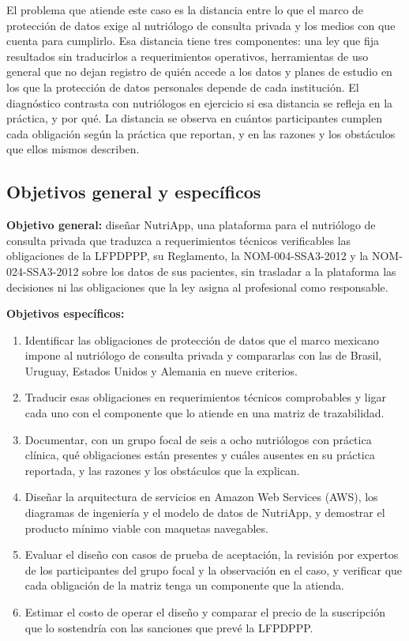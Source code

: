 \documentclass[12pt, a4paper]{article}
\begin{document}
El problema que atiende este caso es la distancia entre lo que el marco
de protección de datos exige al nutriólogo de consulta privada y los
medios con que cuenta para cumplirlo. Esa distancia tiene tres
componentes: una ley que fija resultados sin traducirlos a
requerimientos operativos, herramientas de uso general que no dejan
registro de quién accede a los datos y planes de estudio en los que la
protección de datos personales depende de cada institución. El
diagnóstico contrasta con nutriólogos en ejercicio si esa distancia se
refleja en la práctica, y por qué. La distancia se observa en cuántos
participantes cumplen cada obligación según la práctica que reportan, y
en las razones y los obstáculos que ellos mismos describen.

\subsection{Objetivos general y específicos}
\textbf{Objetivo general:} diseñar NutriApp, una plataforma para el
nutriólogo de consulta privada que traduzca a requerimientos técnicos
verificables las obligaciones de la LFPDPPP, su Reglamento, la
NOM-004-SSA3-2012 y la NOM-024-SSA3-2012 sobre los datos de sus
pacientes, sin trasladar a la plataforma las decisiones ni las
obligaciones que la ley asigna al profesional como responsable.
 
\textbf{Objetivos específicos:}
 
\begin{enumerate}
  \item Identificar las obligaciones de protección de datos que el
    marco mexicano impone al nutriólogo de consulta privada y
    compararlas con las de Brasil, Uruguay, Estados Unidos y Alemania
    en nueve criterios.
  \item Traducir esas obligaciones en requerimientos técnicos
    comprobables y ligar cada uno con el componente que lo atiende en
    una matriz de trazabilidad.
  \item Documentar, con un grupo focal de seis a ocho nutriólogos con
    práctica clínica, qué obligaciones están presentes y cuáles
    ausentes en su práctica reportada, y las razones y los obstáculos
    que la explican.
  \item Diseñar la arquitectura de servicios en Amazon Web Services
    (AWS), los diagramas de ingeniería y el modelo de datos de
    NutriApp, y demostrar el producto mínimo viable con maquetas
    navegables.
  \item Evaluar el diseño con casos de prueba de aceptación, la
    revisión por expertos de los participantes del grupo focal y la
    observación en el caso, y verificar que cada obligación de la
    matriz tenga un componente que la atienda.
  \item Estimar el costo de operar el diseño y comparar el precio de la suscripción que lo sostendría con las
    sanciones que prevé la LFPDPPP.
\end{enumerate}
\end{document}
